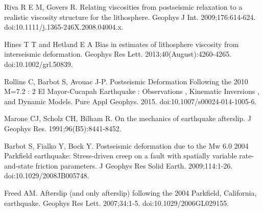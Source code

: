 \documentclass[12pt]{article}
\begin{document}
\begin{thebibliography}{}
 Riva R E M, Govers
  R. Relating viscosities from postseismic relaxation to a realistic
  viscosity structure for the lithosphere. Geophys J
  Int. 2009;176:614-624. doi:10.1111/j.1365-246X.2008.04004.x.

 Hines T T and
  Hetland E A Bias in estimates of lithosphere viscosity from
  interseismic deformation. Geophys Res
  Lett. 2013;40(August):4260-4265. doi:10.1002/grl.50839.

 Rollins C, Barbot S,
  Avouac J-P. Postseismic Deformation Following the 2010 M=7.2 : 2 El
  Mayor-Cucapah Earthquake : Observations , Kinematic Inversions , and
  Dynamic Models. Pure Appl
  Geophys. 2015. doi:10.1007/s00024-014-1005-6.

 Marone CJ, Scholz CH,
  Bilham R. On the mechanics of earthquake afterslip. J Geophys
  Res. 1991;96(B5):8441-8452.

 Barbot S, Fialko Y, Bock
  Y. Postseismic deformation due to the Mw 6.0 2004 Parkfield
  earthquake: Stress-driven creep on a fault with spatially variable
  rate-and-state friction parameters. J Geophys Res Solid
  Earth. 2009;114:1-26. doi:10.1029/2008JB005748.


 Freed AM. Afterslip (and only
  afterslip) following the 2004 Parkfield, California,
  earthquake. Geophys Res Lett. 2007;34:1-5. doi:10.1029/2006GL029155.




\end{thebibliography}
\end{document}
